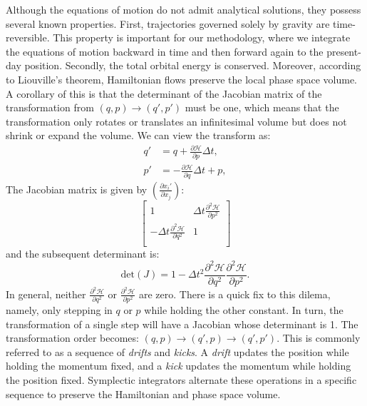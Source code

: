     Although the equations of motion do not admit analytical solutions, they possess several known properties. First, trajectories governed solely by gravity are time-reversible. This property is important for our methodology, where we integrate the equations of motion backward in time and then forward again to the present-day position. Secondly, the total orbital energy is conserved. Moreover, according to Liouville's theorem, Hamiltonian flows preserve the local phase space volume. A corollary of this is that the determinant of the Jacobian matrix of the transformation from $\left(q,p\right)\rightarrow \left(q',p'\right)$ must be one, which means that the transformation only rotates or translates an infinitesimal volume but does not shrink or expand the volume. We can view the transform as: 
    \begin{eqnarray}
        q' &= q + \frac{\partial \mathcal{H}}{\partial p}\Delta t, \\
        p' &= -\frac{\partial \mathcal{H}}{\partial q}\Delta t + p,
    \end{eqnarray}
    The Jacobian matrix is given by $\left(\frac{\partial x_i'}{\partial x_j }\right)$: 
    \begin{equation}
        \begin{bmatrix}
            1 & \Delta t \frac{\partial^2 \mathcal{H}}{\partial p^2} \\  
            -\Delta t \frac{\partial^2 \mathcal{H}}{\partial q^2} & 1 \\  
        \end{bmatrix}
    \end{equation}
    and the subsequent determinant is: 
    \begin{equation}
        \mathrm{det}\left(J\right) = 1 - \Delta t^2 \frac{\partial^2 \mathcal{H}}{\partial q^2} \frac{\partial^2 \mathcal{H}}{\partial p^2}.
    \end{equation}
    In general, neither $\frac{\partial^2 \mathcal{H}}{\partial q^2}$ or $\frac{\partial^2 \mathcal{H}}{\partial p^2}$ are zero. There is a quick fix to this dilema, namely, only stepping in $q$ or $p$ while holding the other constant. In turn, the transformation of a single step will have a Jacobian whose determinant is 1. The transformation order becomes: $(q,p) \rightarrow (q',p) \rightarrow (q',p')$. This is commonly referred to as a sequence of \textit{drifts} and \textit{kicks}. A \textit{drift} updates the position while holding the momentum fixed, and a \textit{kick} updates the momentum while holding the position fixed. Symplectic integrators alternate these operations in a specific sequence to preserve the Hamiltonian and phase space volume.

